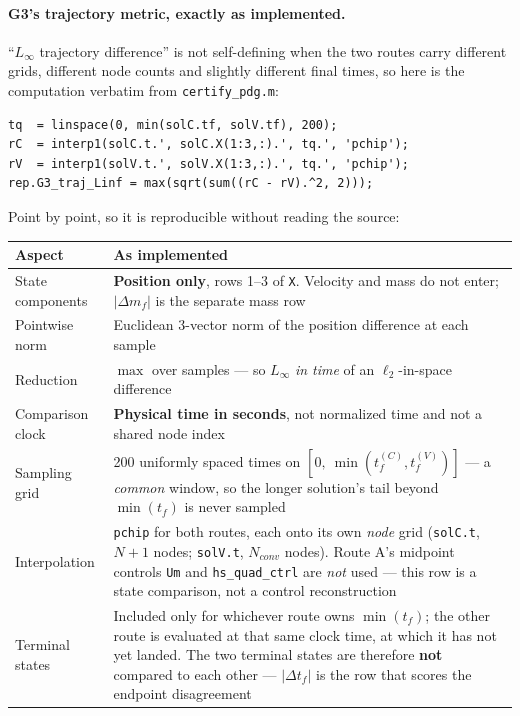 \documentclass[11pt]{article}
\newcommand{\file}[1]{\texttt{#1}}
\begin{document}
\paragraph{G3's trajectory metric, exactly as implemented.} ``$L_\infty$
trajectory difference'' is not self-defining when the two routes carry
different grids, different node counts and slightly different final times,
so here is the computation verbatim from \file{certify\_pdg.m}:

\begin{verbatim}
tq  = linspace(0, min(solC.tf, solV.tf), 200);
rC  = interp1(solC.t.', solC.X(1:3,:).', tq.', 'pchip');
rV  = interp1(solV.t.', solV.X(1:3,:).', tq.', 'pchip');
rep.G3_traj_Linf = max(sqrt(sum((rC - rV).^2, 2)));
\end{verbatim}

Point by point, so it is reproducible without reading the source:

\begin{center}
\begin{tabular}{@{}lL{9.6cm}@{}}
\toprule
Aspect & As implemented \\
\midrule
State components & \textbf{Position only}, rows 1--3 of \texttt{X}.
  Velocity and mass do not enter; $|\Delta m_f|$ is the separate mass row \\
Pointwise norm & Euclidean 3-vector norm of the position difference at each
  sample \\
Reduction & $\max$ over samples --- so $L_\infty$ \emph{in time} of an
  $\ell_2$-in-space difference \\
Comparison clock & \textbf{Physical time in seconds}, not normalized time
  and not a shared node index \\
Sampling grid & 200 uniformly spaced times on
  $[0,\ \min(t_f^{(C)}, t_f^{(V)})]$ --- a \emph{common} window, so the
  longer solution's tail beyond $\min(t_f)$ is never sampled \\
Interpolation & \texttt{pchip} for both routes, each onto its own
  \emph{node} grid (\texttt{solC.t}, $N{+}1$ nodes;
  \texttt{solV.t}, $N_{conv}$ nodes). Route A's midpoint controls
  \texttt{Um} and \texttt{hs\_quad\_ctrl} are \emph{not} used --- this row
  is a state comparison, not a control reconstruction \\
Terminal states & Included only for whichever route owns
  $\min(t_f)$; the other route is evaluated at that same clock time, at
  which it has not yet landed. The two terminal states are therefore
  \textbf{not} compared to each other --- $|\Delta t_f|$ is the row that
  scores the endpoint disagreement \\
\bottomrule
\end{tabular}
\end{center}
\end{document}
